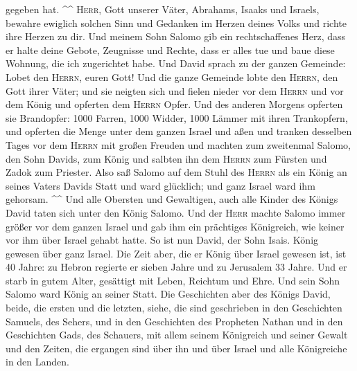 gegeben hat. \^{}\^{}  \textsc{Herr}, Gott unserer Väter,
Abrahams, Isaaks und Israels, bewahre ewiglich solchen Sinn und Gedanken
im Herzen deines Volks und richte ihre Herzen zu dir. 
Und meinem Sohn Salomo gib ein rechtschaffenes Herz, dass er halte deine
Gebote, Zeugnisse und Rechte, dass er alles tue und baue diese Wohnung,
die ich zugerichtet habe.  Und David sprach zu der ganzen
Gemeinde: Lobet den \textsc{Herrn}, euren Gott! Und die ganze Gemeinde
lobte den \textsc{Herrn}, den Gott ihrer Väter; und sie neigten sich und
fielen nieder vor dem \textsc{Herrn} und vor dem König 
und opferten dem \textsc{Herrn} Opfer. Und des anderen Morgens opferten
sie Brandopfer: 1000 Farren, 1000 Widder, 1000 Lämmer mit ihren
Trankopfern, und opferten die Menge unter dem ganzen Israel
 und aßen und tranken desselben Tages vor dem
\textsc{Herrn} mit großen Freuden und machten zum zweitenmal Salomo, den
Sohn Davids, zum König und salbten ihn dem \textsc{Herrn} zum Fürsten
und Zadok zum Priester.  Also saß Salomo auf dem Stuhl
des \textsc{Herrn} als ein König an seines Vaters Davids Statt und ward
glücklich; und ganz Israel ward ihm gehorsam. \^{}\^{} 
Und alle Obersten und Gewaltigen, auch alle Kinder des Königs David
taten sich unter den König Salomo.  Und der \textsc{Herr}
machte Salomo immer größer vor dem ganzen Israel und gab ihm ein
prächtiges Königreich, wie keiner vor ihm über Israel gehabt hatte.
 So ist nun David, der Sohn Isais. König gewesen über
ganz Israel.  Die Zeit aber, die er König über Israel
gewesen ist, ist 40 Jahre: zu Hebron regierte er sieben Jahre und zu
Jerusalem 33 Jahre.  Und er starb in gutem Alter,
gesättigt mit Leben, Reichtum und Ehre. Und sein Sohn Salomo ward König
an seiner Statt.  Die Geschichten aber des Königs David,
beide, die ersten und die letzten, siehe, die sind geschrieben in den
Geschichten Samuels, des Sehers, und in den Geschichten des Propheten
Nathan und in den Geschichten Gads, des Schauers,  mit
allem seinem Königreich und seiner Gewalt und den Zeiten, die ergangen
sind über ihn und über Israel und alle Königreiche in den Landen.
